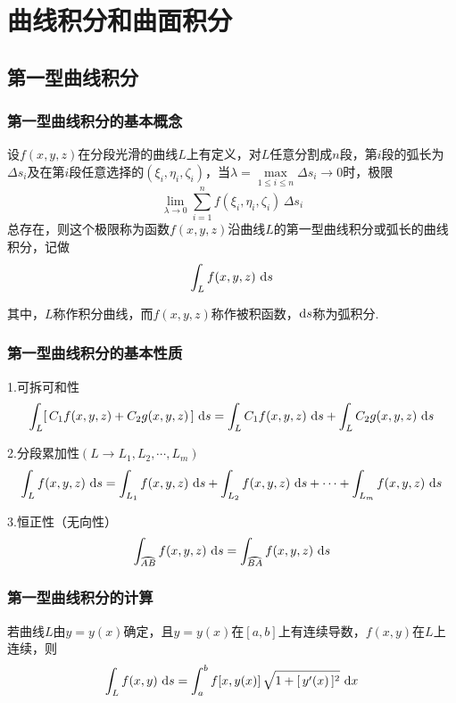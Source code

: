 \thispagestyle{empty}
\chapter{曲线积分和曲面积分}
\section{第一型曲线积分}
\subsection{第一型曲线积分的基本概念}
\tdefination[第一型曲线积分的定义]
设$f(x,y,z)$在分段光滑的曲线$L$上有定义，对$L$任意分割成$n$段，第$i$段的弧长为$\Delta s_i$及在第$i$段任意选择的$(\xi_i,\eta_i,\zeta_i)$，当$\lambda = \max\limits_{1 \le i \le n} {\Delta s_i}\rightarrow 0$时，极限
\begin{equation}
\lim_{\lambda \rightarrow 0} \sum^{n}_{i=1} f(\xi_i,\eta_i,\zeta_i)\,\Delta s_i
\end{equation}
总存在，则这个极限称为函数$f(x,y,z)$沿曲线$L$的第一型曲线积分或弧长的曲线积分，记做
\begin{equation}
	\int_{L}f(x,y,z)\,\,{\rm{d}} s
\end{equation}
\par 其中，$L$称作积分曲线，而$f(x,y,z)$称作被积函数，${\rm{d}} s$称为弧积分.

\subsection{第一型曲线积分的基本性质}
\ttheorem[第一型曲线积分的三个基本性质]
1.可拆可和性
\begin{equation}
\int_{L}[\,C_1f(x,y,z)+C_2g(x,y,z)\,]\,\,{\rm{d}} s =\int_{L}C_1f(x,y,z)\,\,{\rm{d}} s + \int_{L}C_2g(x,y,z)\,\,{\rm{d}} s
\end{equation}

\par 2.分段累加性$(L\rightarrow L_1,L_2,\cdots,L_m)$
\begin{equation}
\int_{L}f(x,y,z)\,\,{\rm{d}} s = \int_{L_1}f(x,y,z)\,\,{\rm{d}} s +\int_{L_2}f(x,y,z)\,\,{\rm{d}} s + \cdots +\int_{L_m}f(x,y,z)\,\,{\rm{d}} s
\end{equation}

\par 3.恒正性（无向性）
\begin{equation}
\int_{\wideparen{AB}}f(x,y,z)\,\,\d s = \int_{\wideparen{BA}}f(x,y,z)\,\,\d s 
\end{equation}

\subsection{第一型曲线积分的计算}
\ttheorem[直角坐标下平面曲线的积分]
若曲线$L$由$y=y(x)$确定，且$y=y(x)$在$[a,b]$上有连续导数，$f(x,y)$在$L$上连续，则
\begin{equation}
\int_{L}f(x,y)\,\,{\rm{d}} s =\int_{a}^{b}f[x,y(x)]\,\sqrt{1+[\,y'(x)\,]^2}\,\,{\rm{d}} x
\end{equation}

